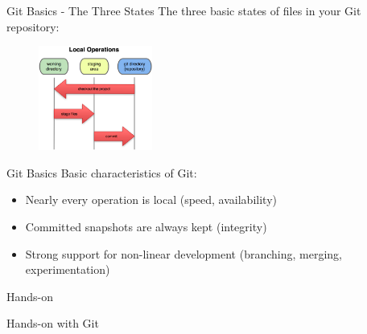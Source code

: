 \documentclass{beamer}
\def \figureHeight {130px}
\begin{document}
\begin{frame}{Git Basics - The Three States}
The three basic states of files in your Git repository:
\begin{figure}
   \includegraphics[height=\figureHeight]{images/the-three-states.png}
\end{figure}
\end{frame}

\begin{frame}{Git Basics}
Basic characteristics of Git:
\begin{itemize}
  \item Nearly every operation is local (speed, availability)
  \item Committed snapshots are always kept (integrity)
  \item Strong support for non-linear development (branching, merging, experimentation)
\end{itemize}
\end{frame}

\begin{frame}{Hands-on}
\begin{center}
Hands-on with Git
\end{center}
\end{frame}
\end{document}
